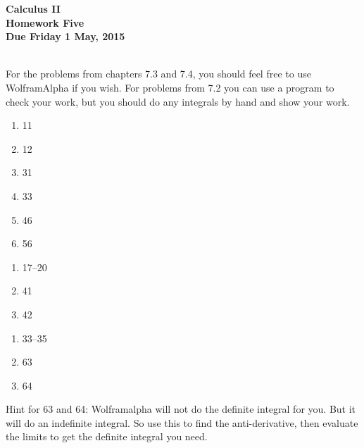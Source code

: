 \documentclass[12pt]{article}
\begin{document}
\pagestyle{empty}
 
\begin{center}
{\large {\bf Calculus II}}\\
\medskip
{\large {\bf Homework Five}}\\
\medskip
{ {\bf Due Friday 1 May, 2015}}\\
\end{center}

\hspace{2mm}\\
   
\noindent For the problems from chapters 7.3 and 7.4, you should feel
free to use WolframAlpha if you wish. For problems from 7.2 you can
use a program to check your work, but you should do any integrals by
hand and show your work.\\
\hspace{2mm}


\begin{enumerate}
\setlength{\itemsep}{-1mm}
  \item 11
  \item 12
  \item 31
  \item 33
  \item 46
  \item 56
\end{enumerate}


\begin{enumerate}
\setlength{\itemsep}{-1mm}
  \item 17--20
  \item 41
  \item 42
\end{enumerate}



\begin{enumerate}
\setlength{\itemsep}{-1mm}
  \item 33--35
  \item 63
  \item 64
\end{enumerate}
 Hint for 63 and 64: Wolframalpha will not do the definite integral for
    you.  But it will do an indefinite integral.  So use this to find
    the anti-derivative, then evaluate the limits to get the definite
    integral you need.
\end{document}
